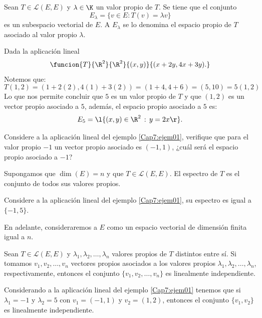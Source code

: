\documentclass[compacto,10pt]{pubciencias-notas}
\begin{document}
\newpage
\begin{prop}
Sean $T \in \mathscr{L}(E,E)$ y $\lambda \in\K$ un valor propio de $T$. Se tiene que el conjunto
\[
    E_\lambda = \{ v\in E : T(v) = \lambda v\} 
\]
es un subespacio vectorial de $E$. A $E_{\lambda}$ se lo denomina el espacio propio de $T$ asociado al valor propio $\lambda$.
\end{prop}

\begin{ejem}\hspace{0pt}\label{Cap7:ejem01} Dada la aplicación lineal
\[
    \funcion{T}{\R^2}{\R^2}{(x,y)}{(x+2y,4x+3y).}
\]
Notemos que:
\[
T(1,2) = (1 + 2(2), 4(1) + 3(2)) = (1+4, 4+6) = (5,10) = 5 (1,2)
\]
Lo que nos permite concluir que $5$ es un valor propio de $T$ y que $(1,2)$ es un vector propio asociado a $5$, además, el espacio propio asociado a $5$ es: 
\[
    E_5 = \l\{(x,y)\in\R^2\,:\,y=2x\r\}.
\]
\end{ejem}

\begin{ejer}\hspace{0pt} Considere a la aplicación lineal del ejemplo \ref{Cap7:ejem01}, verifique que para el valor propio $-1$ un vector propio asociado es $(-1,1)$, ¿cuál será el espacio propio asociado a $-1$?
\end{ejer}

\begin{defi}
Supongamos que $\dim(E) = n$ y que $T\in\mathscr{L}(E,E)$. El espectro de $T$ es el conjunto de todos sus valores propios.
\end{defi}

\begin{ejem}\hspace{0pt} Considere a la aplicación lineal del ejemplo \ref{Cap7:ejem01}, su espectro es igual a $\{-1,5\}$.
\end{ejem}

En adelante, consideraremos a $E$ como un espacio vectorial de dimensión finita igual a $n$.

\begin{teo}
Sean $T \in \mathscr{L}(E,E)$ y $\lambda_1, \lambda_2, \ldots, \lambda_n$ valores propios de $T$ distintos entre sí. Si tomamos $v_1, v_2, \ldots, v_n$ vectores propios asociados a los valores propios $\lambda_1, \lambda_2, \ldots, \lambda_n$, respectivamente, entonces el conjunto $\{v_1, v_2, \ldots, v_n\}$ es linealmente independiente.
\end{teo}

\begin{ejem}\hspace{0pt} Considerando a la aplicación lineal del ejemplo \ref{Cap7:ejem01} tenemos que si $\lambda_{1} = -1$ y $\lambda_{2} = 5$ con $v_{1} = (-1,1)$ y $v_{2} = (1,2)$, entonces el conjunto $\{v_{1}, v_{2}\}$ es linealmente independiente.
\end{ejem}
\end{document}
